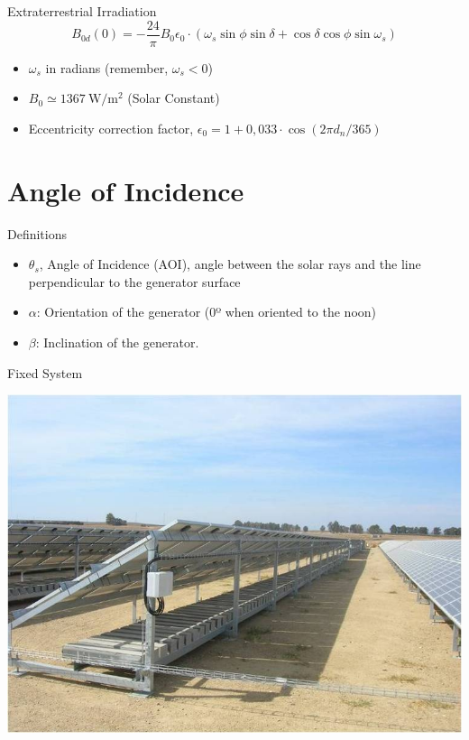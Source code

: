 \documentclass[xcolor={usenames,svgnames,dvipsnames}]{beamer}
\begin{document}
\begin{frame}[label={sec:org0ca3821}]{Extraterrestrial Irradiation}
\[
\boxed{B_{0d}(0)=-\frac{24}{\pi}B_{0}\epsilon_{0}\cdot(\omega_{s}\sin\phi\sin\delta+\cos\delta\cos\phi\sin\omega_{s})}
\]
\begin{itemize}
\item \(\omega_{s}\) in radians (remember, \(\omega_s < 0\))
\item \(B_0 \simeq \SI{1367}{\watt\per\meter\squared}\) (Solar Constant)
\item Eccentricity correction factor, \(\epsilon_0 = 1+0,033\cdot\cos(2\pi d_n/365)\)
\end{itemize}
\end{frame}

\section{Angle of Incidence}
\label{sec:org2aa036d}
\begin{frame}[label={sec:org1e8ecb1}]{Definitions}
\begin{itemize}
\item \(\theta_s\), Angle of Incidence (AOI), angle between the solar rays and the line perpendicular to the generator surface
\item \(\alpha\): Orientation of the generator (0º when oriented to the noon)
\item \(\beta\): Inclination of the generator.
\end{itemize}
\end{frame}

\begin{frame}[label={sec:orgd48f17a}]{Fixed System}
\begin{center}
\includegraphics[width=.9\linewidth]{../figs/EstructuraEstaticaSuelo.jpg}
\end{center}
\end{frame}
\end{document}
